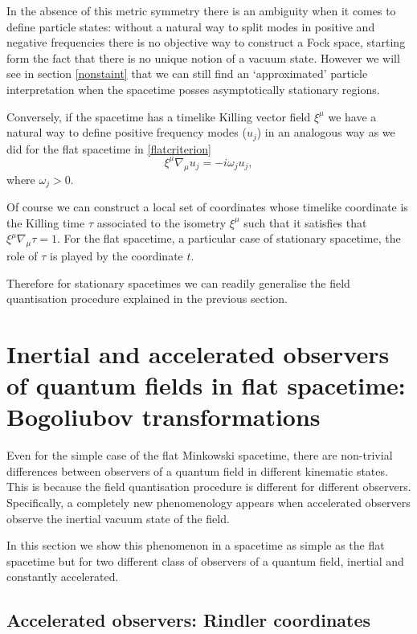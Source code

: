 In the absence of this metric symmetry there is an ambiguity when it comes to define particle states: without a natural way to split modes in positive and negative frequencies there is no objective way to construct a Fock space, starting form the fact that there is no unique notion of a vacuum state. However we will see in section \ref{nonstaint} that we can still find an `approximated' particle interpretation when the spacetime posses asymptotically stationary regions.

Conversely, if the spacetime has a timelike Killing vector field $\xi^\mu$ we have a natural way to define positive frequency modes ($u_j$) in an analogous way as we did for the flat spacetime in \eqref{flatcriterion} 
\begin{equation}\label{criterion2}
\xi^\mu\nabla_\mu u_j = -i \omega_j u_j,
\end{equation}
where $\omega_j>0$.

Of course we can construct a local set of coordinates whose timelike coordinate is the Killing time $\tau$ associated to the isometry $\xi^\mu$ such that it satisfies that $\xi^\mu\nabla_\mu \tau =1$. For the flat spacetime, a particular case of stationary spacetime, the role of $\tau$  is played by the coordinate $t$.

Therefore for stationary spacetimes we can readily generalise the field quantisation procedure explained in the previous section.

\section[Inertial and accelerated observers of quantum fields]{Inertial and accelerated observers of quantum fields in flat spacetime: Bogoliubov transformations}\label{Rindbogo}

Even for the simple case of the flat Minkowski spacetime, there are non-trivial differences between observers of a quantum field in different kinematic states. This is because the field quantisation procedure is different for different observers. Specifically, a completely new phenomenology appears when accelerated observers observe the inertial vacuum state of the field.

In this section we show this phenomenon in a spacetime as simple as the flat spacetime but for two different class of observers of a quantum field, inertial and constantly accelerated.

\subsection{Accelerated observers: Rindler coordinates}

